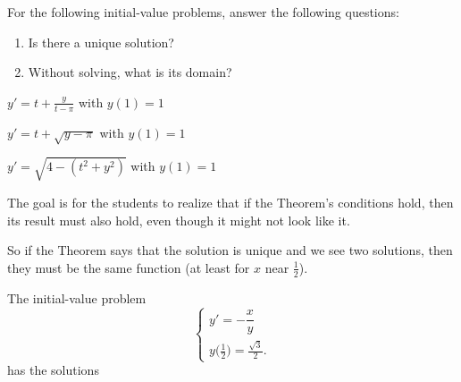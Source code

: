 \begin{lesson}

%	
%
%	

\end{lesson}





\question For the following initial-value problems, answer the following questions:
\begin{enumerate}[label=\color{gray}(\alph*)]
\item Is there a unique solution?

\item Without solving, what is its domain?
\end{enumerate}




\begin{parts}
	\item $y' = t + \frac{y}{t-\pi}$ with $y(1) = 1$
	\item $y' = t + \sqrt{y-\pi}$ with $y(1) = 1$
	\item $y' = \sqrt{4 - (t^2+y^2)}$ with $y(1) = 1$
\end{parts}


\bookonlynewpage


\begin{annotation}
\begin{goals}
	The goal is for the students to realize that if the Theorem's conditions hold, then its result must also hold, even though it might not look like it.
	
	So if the Theorem says that the solution is unique and we see two solutions, then they must be the same function (at least for $x$ near $\frac12$).
\end{goals}
\end{annotation}
\question The initial-value problem
$$
\begin{cases}
y' = -\dfrac{x}{y} \\
y\big(\frac12\big) = \frac{\sqrt{3}}{2}.
\end{cases}
$$
has the solutions

